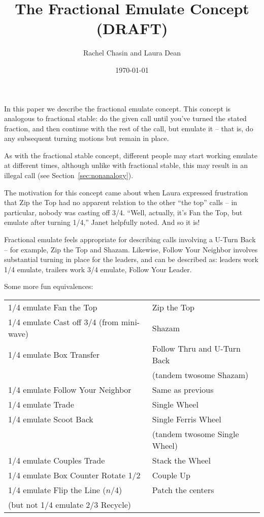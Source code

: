 \documentclass[11pt]{article}
\title{The Fractional Emulate Concept (DRAFT)}
\author{Rachel Chasin and Laura Dean}
\date{\today}
\begin{document}
\thispagestyle{empty}
\maketitle


In this paper we describe the fractional emulate concept. This concept
is analogous to fractional stable: do the given call until you've
turned the stated fraction, and then continue with the rest of the
call, but emulate it -- that is, do any subsequent turning motions 
but remain in place.

As with the fractional stable concept, different people may start
working emulate at different times, although unlike with fractional
stable, this may result in an illegal call (see
Section~\ref{sec:nonanalogy}).

The motivation for this concept came about when Laura expressed
frustration that Zip the Top had no apparent relation to the other
``the top'' calls -- in particular, nobody was casting off 3/4.
``Well, actually, it's Fan the Top, but emulate after turning 1/4,''
Janet helpfully noted.  And so it is!

Fractional emulate feels appropriate for describing calls
involving a U-Turn Back -- for example, Zip the Top and Shazam.
Likewise, Follow Your Neighbor involves substantial turning in place for the leaders,
and can be described as: leaders work 1/4 emulate,
trailers work 3/4 emulate, Follow Your Leader.

Some more fun equivalences:

\begin{tabular}{|l|l|}
\hline
1/4 emulate Fan the Top   & Zip the Top \\
1/4 emulate Cast off 3/4 (from mini-wave)  & Shazam \\
1/4 emulate Box Transfer & Follow Thru and U-Turn Back \\
& (tandem twosome Shazam) \\
1/4 emulate Follow Your Neighbor  & Same as previous\\
1/4 emulate Trade                          & Single Wheel \\
1/4 emulate Scoot Back  & Single Ferris Wheel \\
& (tandem twosome Single Wheel)\\
1/4 emulate Couples Trade  & Stack the Wheel \\
1/4 emulate Box Counter Rotate 1/2 & Couple Up \\
1/4 emulate Flip the Line ($n$/4) & Patch the centers \\
(but not 1/4 emulate 2/3 Recycle) & \\
\hline
\end{tabular}
\end{document}

